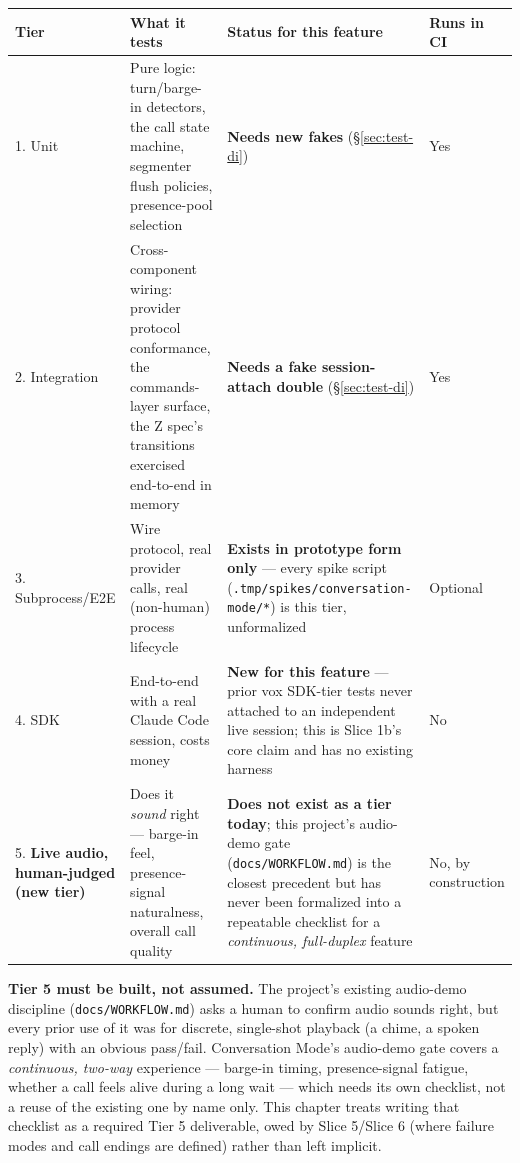 \documentclass[a4paper,11pt]{report}
\begin{document}
\begin{center}
\begin{tabular}{@{}p{2.3cm}p{5.6cm}p{3.3cm}p{2.5cm}@{}}
\toprule
Tier & What it tests & Status for this feature & Runs in CI \\
\midrule
1. Unit & Pure logic: turn/barge-in detectors, the call state machine,
  segmenter flush policies, presence-pool selection & \textbf{Needs new
  fakes} (\S\ref{sec:test-di}) & Yes \\
2. Integration & Cross-component wiring: provider protocol conformance,
  the commands-layer surface, the Z spec's transitions exercised
  end-to-end in memory & \textbf{Needs a fake session-attach double}
  (\S\ref{sec:test-di}) & Yes \\
3. Subprocess/E2E & Wire protocol, real provider calls, real (non-human)
  process lifecycle & \textbf{Exists in prototype form only} --- every
  spike script (\texttt{.tmp/spikes/conversation-mode/*}) is this tier,
  unformalized & Optional \\
4. SDK & End-to-end with a real Claude Code session, costs money &
  \textbf{New for this feature} --- prior vox SDK-tier tests never
  attached to an independent live session; this is Slice 1b's core
  claim and has no existing harness & No \\
5. \textbf{Live audio, human-judged (new tier)} & Does it \emph{sound}
  right --- barge-in feel, presence-signal naturalness, overall call
  quality & \textbf{Does not exist as a tier today}; this project's
  audio-demo gate (\texttt{docs/WORKFLOW.md}) is the closest precedent
  but has never been formalized into a repeatable checklist for a
  \emph{continuous, full-duplex} feature & No, by
  construction \\
\bottomrule
\end{tabular}
\end{center}

\textbf{Tier 5 must be built, not assumed.} The project's existing
audio-demo discipline (\texttt{docs/WORKFLOW.md}) asks a human to confirm
audio sounds right, but every prior use of it was for discrete,
single-shot playback (a chime, a spoken reply) with an obvious pass/fail.
Conversation Mode's audio-demo gate covers a \emph{continuous, two-way}
experience --- barge-in timing, presence-signal fatigue, whether a call
feels alive during a long wait --- which needs its own checklist, not a
reuse of the existing one by name only. This chapter treats writing that
checklist as a required Tier 5 deliverable, owed by Slice 5/Slice 6
(where failure modes and call endings are defined) rather than left
implicit.
\end{document}

